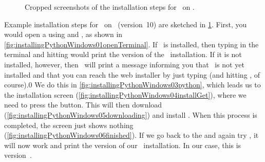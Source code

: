 %
%
\begin{figure}%
\centering%
%
\hfill%
%
%
%
\hfill%
%
%
%
\floatRowSep%
%
%
\hfill%
%
%
%
\floatRowSep%
%
%
%
\hfill%
%
%
%
\caption{Cropped screenshots of the installation steps for \python\ on \microsoftWindows.}%
\label{fig:installPythonWindows}%
\end{figure}%
%
Example installation steps for \python\ on \microsoftWindows\ (version~10) are sketched in \cref{fig:installPythonWindows}.
First, you would open a  using and \windowsTerminal, as shown in \cref{fig:installingPythonWindows01openTerminal}.
If \python\ is installed, then typing  in the terminal and hitting \keys{\return} would print the version of the \python\ installation.
If it is not installed, however, then \microsoftWindows\ will print a message informing you that \python\ is not yet installed and that you can reach the web installer by just typing  (and hitting \keys{\return}, of course).0
We do this in \cref{fig:installingPythonWindows03python}, which leads us to the installation screen (\cref{fig:installingPythonWindows04installGet}), where we need to press the  button.
This will then download (\cref{fig:installingPythonWindows05downloading}) and install \python.
When this process is completed, the screen just shows nothing (\cref{fig:installingPythonWindows06finished}).
If we go back to the  and again try , it will now work and print the version of our \python\ installation.
In our case, this is version~.%
%
\FloatBarrier%
\endhsection%
%
